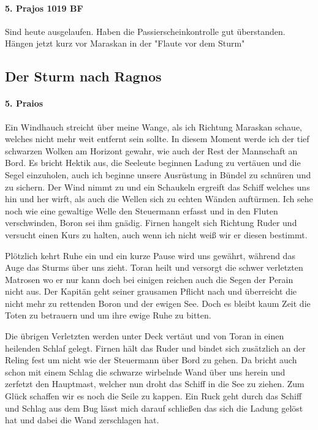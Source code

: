 \paragraph{5. Prajos 1019 BF}
Sind heute ausgelaufen. Haben die Passierscheinkontrolle gut überstanden. Hängen jetzt kurz vor Maraskan in der "Flaute vor dem Sturm"

\subsection{Der Sturm nach Ragnos}

\paragraph{5. Praios}
Ein Windhauch streicht über meine Wange, als ich Richtung Maraskan schaue, welches nicht mehr weit entfernt sein sollte. In diesem Moment werde ich der tief schwarzen Wolken am Horizont gewahr, wie auch der Rest der Mannschaft an Bord. Es bricht Hektik aus, die Seeleute beginnen Ladung zu vertäuen und die Segel einzuholen, auch ich beginne unsere Ausrüstung in Bündel zu schnüren und zu sichern. Der Wind nimmt zu und ein Schaukeln ergreift das Schiff welches uns hin und her wirft, als auch die Wellen sich zu echten Wänden auftürmen. Ich sehe noch wie eine gewaltige Welle den Steuermann erfasst und in den Fluten verschwinden, Boron sei ihm gnädig. Firnen hangelt sich Richtung Ruder und versucht einen Kurs zu halten, auch wenn ich nicht weiß wir er diesen bestimmt. 

Plötzlich kehrt Ruhe ein und ein kurze Pause wird uns gewährt, während das Auge das Sturms über uns zieht. Toran heilt und versorgt die schwer verletzten Matrosen wo er nur kann doch bei einigen reichen auch die Segen der Perain nicht aus. Der Kapitän geht seiner grausamen Pflicht nach und überreicht die nicht mehr zu rettenden Boron und der ewigen See. Doch es bleibt kaum Zeit die Toten zu betrauern und um ihre ewige Ruhe zu bitten. 

Die übrigen Verletzten werden unter Deck vertäut und von Toran in einen heilenden Schlaf gelegt. Firnen hält das Ruder und bindet sich zusätzlich an der Reling fest um nicht wie der Steuermann über Bord zu gehen. Da bricht auch schon mit einem Schlag die schwarze wirbelnde Wand über uns herein und zerfetzt den Hauptmast, welcher nun droht das Schiff in die See zu ziehen. Zum Glück schaffen wir es noch die Seile zu kappen. Ein Ruck geht durch das Schiff und Schlag aus dem Bug lässt mich darauf schließen das sich die Ladung gelöst hat und dabei die Wand zerschlagen hat. 


